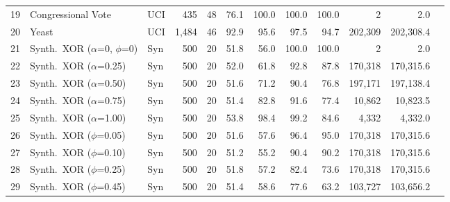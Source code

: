 \begin{table}[htbp]
\begin{tabular}{rllrrrrrrrrr}
        19 & Congressional Vote & UCI & 435 & 48 & 76.1 & 100.0 & 100.0 & 100.0 & 2 & 2.0 \\
        20 & Yeast & UCI & 1,484 & 46 & 92.9 & 95.6 & 97.5 & 94.7 & 202,309 & 202,308.4 \\
        \midrule
        21 & Synth.\ XOR ($\alpha$=0, $\phi$=0) & Syn & 500 & 20 & 51.8 & 56.0 & 100.0 & 100.0 & 2 & 2.0 \\
        22 & Synth.\ XOR ($\alpha$=0.25) & Syn & 500 & 20 & 52.0 & 61.8 & 92.8 & 87.8 & 170,318 & 170,315.6 \\
        23 & Synth.\ XOR ($\alpha$=0.50) & Syn & 500 & 20 & 51.6 & 71.2 & 90.4 & 76.8 & 197,171 & 197,138.4 \\
        24 & Synth.\ XOR ($\alpha$=0.75) & Syn & 500 & 20 & 51.4 & 82.8 & 91.6 & 77.4 & 10,862 & 10,823.5 \\
        25 & Synth.\ XOR ($\alpha$=1.00) & Syn & 500 & 20 & 53.8 & 98.4 & 99.2 & 84.6 & 4,332 & 4,332.0 \\
        26 & Synth.\ XOR ($\phi$=0.05) & Syn & 500 & 20 & 51.6 & 57.6 & 96.4 & 95.0 & 170,318 & 170,315.6 \\
        27 & Synth.\ XOR ($\phi$=0.10) & Syn & 500 & 20 & 51.2 & 55.2 & 90.4 & 90.2 & 170,318 & 170,315.6 \\
        28 & Synth.\ XOR ($\phi$=0.25) & Syn & 500 & 20 & 51.8 & 57.2 & 82.4 & 73.6 & 170,318 & 170,315.6 \\
        29 & Synth.\ XOR ($\phi$=0.45) & Syn & 500 & 20 & 51.4 & 58.6 & 77.6 & 63.2 & 103,727 & 103,656.2 \\
        \bottomrule
    \end{tabular}
\end{table}
